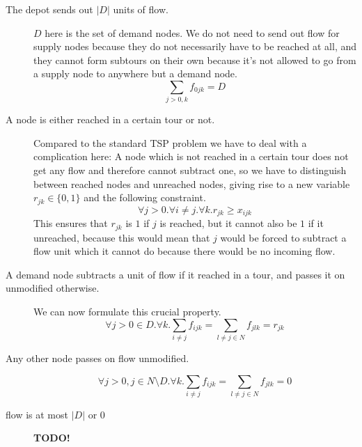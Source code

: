 \begin{description}
  \item[The depot sends out $|D|$ units of flow.] $D$ here is the set of demand nodes. We do 
  not need to send out flow for supply nodes because they do not necessarily have to be
  reached at all, and they cannot form subtours on their own because it's not allowed to 
  go from a supply node to anywhere but a demand node.
     \begin{equation}
       \sum_{j>0,k} f_{0jk} = D
     \end{equation}

  \item[A node is either reached in a certain tour or not.]
     Compared to the standard TSP problem we have to deal with a complication here: A node which 
     is not reached in a certain tour does not get any flow and therefore cannot subtract one,
     so we have to distinguish between reached nodes and unreached nodes, giving rise to a new
     variable $r_{jk} \in \{0,1\}$ and the following constraint.
     \begin{equation}
        \forall j>0. \forall i \neq j. \forall k. r_{jk} \geq x_{ijk}
     \end{equation}
     This ensures that $r_{jk}$ is $1$ if $j$ is reached, but it cannot also be $1$ if it unreached,
     because this would mean that $j$ would be forced to subtract a flow unit which it cannot
     do because there would be no incoming flow.

  \item[A demand node subtracts a unit of flow if it reached in a tour, and passes it on unmodified
        otherwise.] We can now formulate this crucial property.
  \begin{equation}
        \forall j>0 \in D. \forall k. \sum_{i \neq j} f_{ijk} = \sum_{l \neq j \in N} f_{jlk} = r_{jk}
  \end{equation}

  \item[Any other node passes on flow unmodified.]
  \begin{equation}
        \forall j>0, j \in N \setminus D. \forall k. \sum_{i \neq j} f_{ijk} = \sum_{l \neq j \in N} f_{jlk} = 0
  \end{equation}

  \item[flow is at most $|D|$ or $0$] \textbf{TODO!}

\end{description}
